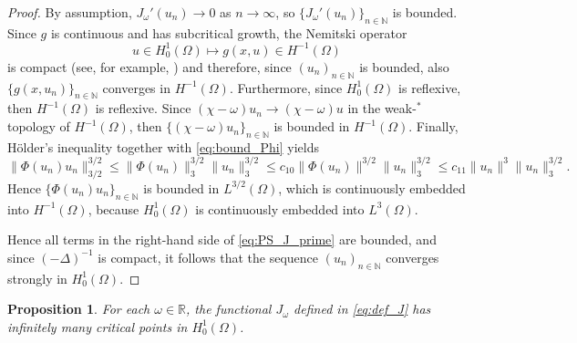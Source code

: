\documentclass[10pt,a4paper]{amsart}
\numberwithin{equation}{section}
\newtheorem{proposition}[theo]{Proposition}
\begin{document}
\begin{proof}
By assumption, $J_\omega'(u_n) \to 0$ as $n \to \infty$, so 
$\{J_\omega'(u_n)\}_{n \in \mathbb N}$ is bounded. Since $g$ is continuous and has 
subcritical growth, the Nemitski operator
\[
 u \in H_0^1(\Omega) \mapsto g(x, u) \in H^{-1}(\Omega)
\]
is compact (see, for example, \cite{AmbrosettiMalchiodi2007, AmbrosettiProdi1993}) and 
therefore, since $(u_n)_{n \in \mathbb N}$ is bounded, also 
$\{g(x, u_n)\}_{n \in \mathbb N}$ converges in $H^{-1}(\Omega)$. Furthermore, 
since $H_0^1(\Omega)$ is reflexive, then $H^{-1}(\Omega)$ is reflexive. 
Since $(\chi - \omega) u_n \to (\chi - \omega) u$ in the weak-$^*$ topology of 
$H^{-1}(\Omega)$, then $\{(\chi - \omega)u_n\}_{n \in \mathbb N}$ is bounded in 
$H^{-1}(\Omega)$. Finally, H\"older's inequality together with \eqref{eq:bound_Phi} 
yields
\begin{equation}
 \|\Phi(u_n) u_n\|_{3/2}^{3/2}
  \leq \|\Phi(u_n)\|_3^{3/2} \|u_n\|_3^{3/2}
  \leq c_{10} \|\Phi(u_n)\|^{3/2} \|u_n\|_3^{3/2}
  \leq c_{11} \|u_n\|^3 \|u_n\|_3^{3/2}.
\end{equation}
Hence $\{\Phi(u_n)u_n\}_{n \in \mathbb N}$ is bounded in $L^{3/2}(\Omega)$,
which is continuously embedded into $H^{-1}(\Omega)$, because $H_0^1(\Omega)$ is
continuously embedded into $L^3(\Omega)$.

Hence all terms in the right-hand side of \eqref{eq:PS_J_prime} are bounded, and 
since $(- \Delta)^{-1}$ is compact, it follows that the sequence 
$(u_n)_{n \in \mathbb N}$ converges strongly in $H_0^1(\Omega)$.
\end{proof}


\begin{proposition}
 \label{prop:Critical_points_J_Dirichlet}
For each $\omega \in \mathbb R$, the functional $J_\omega$ defined in \eqref{eq:def_J} 
has infinitely many critical points in $H_0^1(\Omega)$.
\end{proposition}
\end{document}
